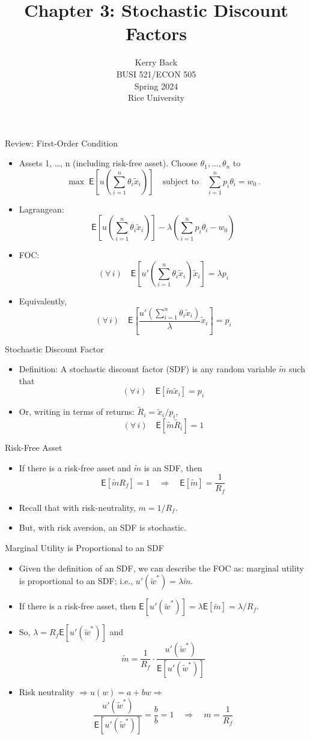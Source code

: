 \documentclass[10pt]{beamer}
\title{Chapter 3: Stochastic Discount Factors}
\date{}
\author{Kerry Back\\ 
BUSI 521/ECON 505\\
Spring 2024\\
Rice University}
\newcommand{\bi}{\begin{itemize}}
\newcommand{\ei}{\end{itemize}}
\newcommand{\im}{\item}
\newcommand{\mye}{\ensuremath{\mathsf{E}}}
\newcommand{\tw}{\tilde{w}}
\newcommand{\tx}{\tilde{x}}
\newcommand{\tm}{\tilde{m}}
\newcommand{\tr}{\widetilde{R}}
\newcommand{\tr}{\widetilde{\mathbf{R}}}
\begin{document}
\maketitle



\begin{frame}{Review: First-Order Condition}
 \bi
 \im Assets 1, \ldots, n (including risk-free asset).  Choose $\theta_1, \ldots, \theta_n$ to 
 $$\max \; \mye\left[ u\left( \sum_{i=1}^n \theta_i\tx_i \right) \right] \quad \text{subject to} \quad \sum_{i=1}^n p_i \theta_i = w_0\,.$$
\im Lagrangean:
$$\mye\left[ u\left( \sum_{i=1}^n \theta_i\tx_i \right) \right] - \lambda \left( \sum_{i=1}^n p_i \theta_i - w_0 \right)$$
\im FOC:
$$(\forall \, i) \quad \mye\left[ u'\left( \sum_{i=1}^n \theta_i\tx_i \right) \tx_i \right] = \lambda p_i$$
\im Equivalently,
$$(\forall \, i) \quad \mye\left[ \frac{u'\left( \sum_{i=1}^n \theta_i\tx_i \right) }{\lambda}\tx_i \right] =  p_i$$
\ei
\end{frame}

\begin{frame}{Stochastic Discount Factor}
    \bi 
    \im Definition: A stochastic discount factor (SDF) is any random variable $\tm$ such that
    $$(\forall \, i) \quad \mye\left[ \tm\tx_i \right] =  p_i$$
    \im Or, writing in terms of returns: $\tr_i = \tx_i/p_i$,
    $$(\forall \, i) \quad \mye\left[ \tm\tr_i \right] =  1$$
    \ei 
\end{frame}

\begin{frame}{Risk-Free Asset}
    \bi 
    \im If there is a risk-free asset and $\tm$ is an SDF, then 
    $$\mye[\tm R_f] = 1 \quad \Rightarrow \quad \mye[\tm] = \frac{1}{R_f}$$
    \im Recall that with risk-neutrality, $ m =1/R_f$.
    \im But, with risk aversion, an SDF is stochastic.
    \ei 
\end{frame}

\begin{frame}{Marginal Utility is Proportional to an SDF}
    \bi 
    \im 
    Given the definition of an SDF, we can describe the FOC as: marginal utility is proportional to an SDF; i.e., $u'(\tw^*) = \lambda\tm$.
    \im If there is a risk-free asset, then $\mye[u'(\tw^*)] = \lambda \mye[\tm] = \lambda / R_f$.
    \im So, $\lambda = R_f \mye[u'(\tw^*)]$ and
    $$ \tm = \frac{1}{R_f} \cdot \frac{u'(\tw^*)}{\mye[u'(\tw^*)]}$$
    \im Risk neutrality $\Rightarrow u(w) = a + b w \Rightarrow$
    $$\frac{u'(\tw^*)}{\mye[u'(\tw^*)]} = \frac{b}{b} = 1 \quad \Rightarrow \quad m = \frac{1}{R_f}$$
    \ei 
\end{frame}
\end{document}

